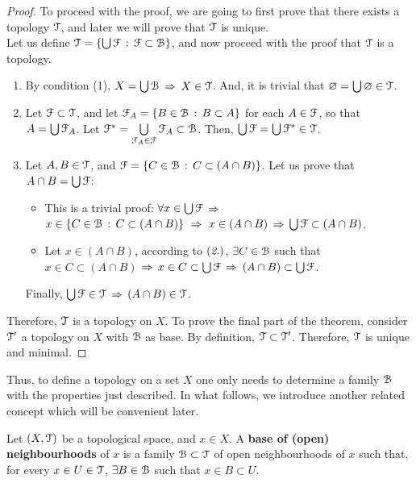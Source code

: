 \begin{proof}
	To proceed with the proof, we are going to first prove that there exists a topology $\EuScript{T}$, and later
	we will prove that $\EuScript{T}$ is unique.\\
	Let us define $\EuScript{T} = \{\bigcup \EuScript{F}\,:\,\EuScript{F}\subset \EuScript{B}\}$, and now proceed with the proof
	that $\EuScript{T}$ is a topology.
	\begin{enumerate}
		\item By condition (1), $X=\bigcup \EuScript{B}$ $\Rightarrow$ $X\in \EuScript{T}$.
		And, it is trivial that $\varnothing = \bigcup \varnothing \in \EuScript{T}$.

		\item Let $\EuScript{F}\subset \EuScript{T}$, and let $\EuScript{F}_A=\{B\in \EuScript{B}\,:\, B\subset A\}$ for each
		$A\in\EuScript{F}$, so that $A=\bigcup\EuScript{F}_A$.
		Let $\EuScript{F}^*=\bigcup\limits_{\EuScript{F}_A\in\EuScript{F}}\EuScript{F}_A\subset\EuScript{B}$.
		Then,  $\bigcup \EuScript{F} =\bigcup\EuScript{F}^*\in\EuScript{T}$.

		\item Let $A, B\in \EuScript{T}$, and $\EuScript{F} = \{C\in\EuScript{B}\,:\, C \subset(A\cap B)\}$.
		Let us prove that $A\cap B = \bigcup\EuScript{F}$:
		\begin{itemize}
			\item[\boxed{\supseteq}] This is a trivial proof: $\forall x\in\bigcup\EuScript{F}$ $\Rightarrow$
			$x\in\left\{C\in\EuScript{B}\,:\,C\subset(A\cap B)\right\}\ \Rightarrow\ x\in (A\cap B)$ $\Rightarrow$
			$\bigcup\EuScript{F} \subset (A\cap B)$.
			\item[\boxed{\subseteq}] Let $x\in (A\cap B)$, according to $(\emph{2.})$,
			$\exists C\in \EuScript{B}$ such that $x\in C\subset (A\cap B)$ $\Rightarrow$ $x\in C\subset
			\bigcup\EuScript{F}$ $\Rightarrow$ $(A\cap B)\subset \bigcup\EuScript{F}$.
		\end{itemize}
		Finally, $\bigcup \EuScript{F}\in \EuScript{T}$ $\Rightarrow$ $(A\cap B) \in \EuScript{T}$.
	\end{enumerate}
	Therefore, $\EuScript{T}$ is a topology on $X$.
	To prove the final part of the theorem, consider $\EuScript{T}'$ a topology on $X$ with
	$\EuScript{B}$ as base.
	By definition, $\EuScript{T}\subset \EuScript{T}'$.
	Therefore, $\EuScript{T}$ is unique and minimal.
\end{proof}

Thus, to define a topology on a set $X$ one only needs to determine a family $\EuScript{B}$ with
the properties just described.
In what follows, we introduce another related concept which will be convenient later.
\begin{definition}
	\label{def:base-open-neighbourhoods}
	Let $(X, \EuScript{T})$ be a topological space, and $x\in X$.
	A \textbf{base of (open) neighbourhoods} of $x$ is a family $\EuScript{B}\subset\EuScript{T}$ of open
	neighbourhoods of $x$ such that, for every $x\in U\in \EuScript{T}$, $\exists B\in\EuScript{B}$ such that
	$x\in B\subset U$.
\end{definition}

